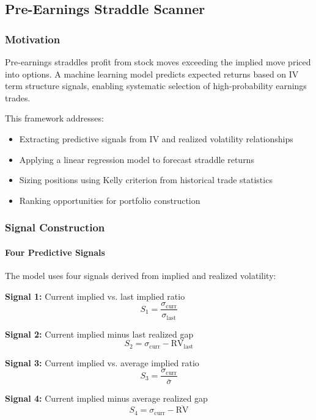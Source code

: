 \subsection{Pre-Earnings Straddle Scanner}

\subsubsection{Motivation}

Pre-earnings straddles profit from stock moves exceeding the implied move priced into options. A machine learning model predicts expected returns based on IV term structure signals, enabling systematic selection of high-probability earnings trades.

This framework addresses:
\begin{itemize}
  \item Extracting predictive signals from IV and realized volatility relationships
  \item Applying a linear regression model to forecast straddle returns
  \item Sizing positions using Kelly criterion from historical trade statistics
  \item Ranking opportunities for portfolio construction
\end{itemize}

\subsubsection{Signal Construction}

\paragraph{Four Predictive Signals}

The model uses four signals derived from implied and realized volatility:

\textbf{Signal 1:} Current implied vs. last implied ratio
\[
S_1 = \frac{\sigma_{\text{curr}}}{\sigma_{\text{last}}}
\]

\textbf{Signal 2:} Current implied minus last realized gap
\[
S_2 = \sigma_{\text{curr}} - \text{RV}_{\text{last}}
\]

\textbf{Signal 3:} Current implied vs. average implied ratio
\[
S_3 = \frac{\sigma_{\text{curr}}}{\bar{\sigma}}
\]

\textbf{Signal 4:} Current implied minus average realized gap
\[
S_4 = \sigma_{\text{curr}} - \overline{\text{RV}}
\]

